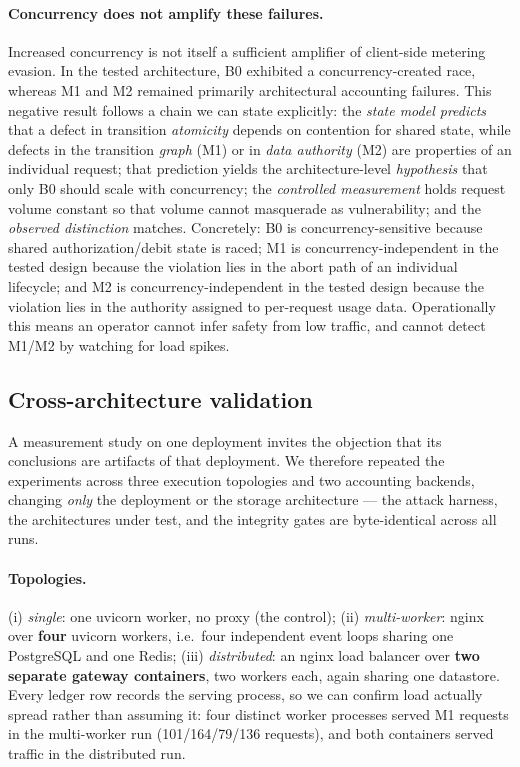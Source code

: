 \documentclass[11pt]{article}
\begin{document}
\paragraph{Concurrency does not amplify these failures.}
Increased concurrency is not itself a sufficient amplifier of client-side metering
evasion. In the tested architecture, B0 exhibited a concurrency-created race, whereas M1
and M2 remained primarily architectural accounting failures. This negative result follows
a chain we can state explicitly: the \emph{state model predicts} that a defect in
transition \emph{atomicity} depends on contention for shared state, while defects in the
transition \emph{graph} (M1) or in \emph{data authority} (M2) are properties of an
individual request; that prediction yields the architecture-level \emph{hypothesis} that
only B0 should scale with concurrency; the \emph{controlled measurement} holds request
volume constant so that volume cannot masquerade as vulnerability; and the
\emph{observed distinction} matches. Concretely: B0 is concurrency-sensitive because
shared authorization/debit state is raced; M1 is concurrency-independent in the tested
design because the violation lies in the abort path of an individual lifecycle; and M2 is
concurrency-independent in the tested design because the violation lies in the authority
assigned to per-request usage data. Operationally this means an operator cannot infer
safety from low traffic, and cannot detect M1/M2 by watching for load spikes.

\subsection{Cross-architecture validation}
\label{sec:generality}
A measurement study on one deployment invites the objection that its conclusions are
artifacts of that deployment. We therefore repeated the experiments across three
execution topologies and two accounting backends, changing \emph{only} the deployment or
the storage architecture --- the attack harness, the architectures under test, and the
integrity gates are byte-identical across all runs.

\paragraph{Topologies.} (i) \emph{single}: one uvicorn worker, no proxy (the control);
(ii) \emph{multi-worker}: nginx over \textbf{four} uvicorn workers, i.e.\ four independent
event loops sharing one PostgreSQL and one Redis; (iii) \emph{distributed}: an nginx load
balancer over \textbf{two separate gateway containers}, two workers each, again sharing one
datastore. Every ledger row records the serving process, so we can confirm load actually
spread rather than assuming it: four distinct worker processes served M1 requests in the
multi-worker run (101/164/79/136 requests), and both containers served traffic in the
distributed run.
\end{document}
